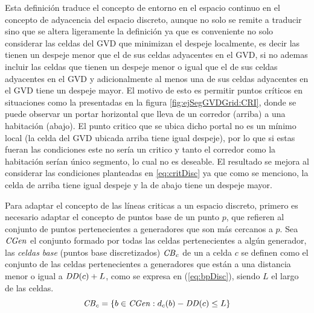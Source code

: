Esta definición traduce el concepto de entorno en el espacio continuo
en el concepto de adyacencia del espacio discreto, aunque no solo se remite a
traducir sino que se altera ligeramente la definición ya que es conveniente no
solo considerar las celdas del GVD que minimizan el despeje localmente, es
decir las tienen un despeje menor que el de sus celdas adyacentes en el GVD, si
no ademas incluir las celdas que tienen un despeje menor o igual que el de sus
celdas adyacentes en el GVD y adicionalmente al menos una de sus celdas
adyacentes en el GVD tiene un despeje mayor.
El motivo de esto es permitir puntos críticos en situaciones como la
presentadas en la figura \ref{fig:ejSegGVDGrid:CRI}, donde se puede observar un
portar horizontal que lleva de un corredor (arriba) a una habitación (abajo).
El punto critico que se ubica dicho portal no es un mínimo local (la celda del
GVD ubicada arriba tiene igual despeje), por lo que si estas fueran las
condiciones este no sería un critico y tanto el corredor como la habitación
serían único segmento, lo cual no es deseable. El resultado se mejora al
considerar las condiciones planteadas en \ref{eq:critDisc} ya que como se
menciono, la celda de arriba tiene igual despeje y la de abajo tiene un despeje
mayor. 



Para adaptar el concepto de las líneas criticas a un espacio discreto, primero
es necesario adaptar el concepto de puntos base de un punto $p$, que refieren
al conjunto de puntos pertenecientes a generadores que son más cercanos a $p$.
Sea $\mathit{CGen}$ el conjunto formado por todas las celdas pertenecientes a
algún generador, las \emph{celdas base} (puntos base discretizados) $\mathit{CB}_c$ de
un a celda $c$ se definen como el conjunto de las celdas pertenecientes a
generadores que están a una distancia menor o igual a $\mathit{DD}(c)+L$, como se
expresa en (\ref{eq:bpDisc}), siendo $L$ el largo de las celdas.
\begin{equation}
\mathit{CB}_c = \{ b \in \mathit{CGen} : d_c(b) - \mathit{DD}(c) \leq L\}
\label{eq:bpDisc}
\end{equation}

